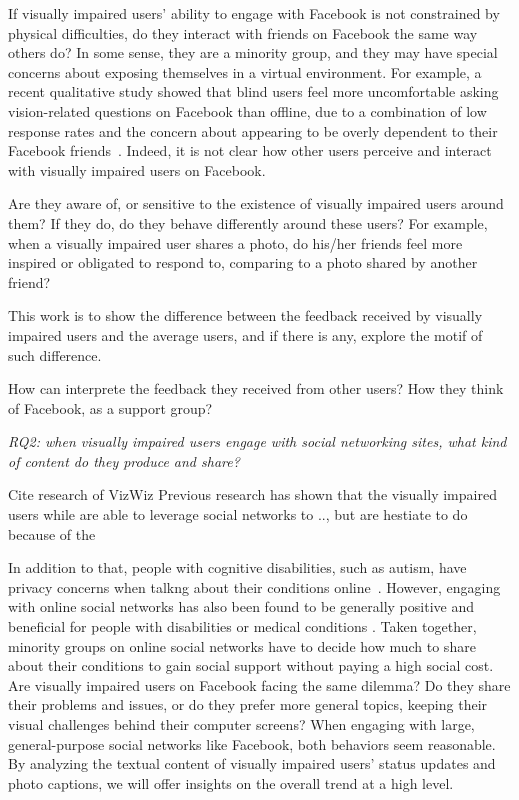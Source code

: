 \documentclass{sigchi}
\begin{document}

If visually impaired users' ability to engage with Facebook is not constrained by physical difficulties, do they interact with friends on Facebook the same way others do? In some sense, they are a minority group, and they may have special concerns about exposing themselves in a virtual environment. For example, a recent qualitative study showed that blind users feel more uncomfortable asking vision-related questions on Facebook than offline, due to a combination of low response rates and the concern about appearing to be overly dependent to their Facebook friends~\cite{brady2013cscw}. Indeed, it is not clear how other users perceive and interact with visually impaired users on Facebook. 

Are they aware of, or sensitive to the existence of visually impaired users around them? If they do, do they behave differently  around these users? For example, when a visually impaired user shares a photo, do his/her friends feel more inspired or obligated to respond to, comparing to a photo shared by another friend? 

This work is to show the difference between the feedback received by visually impaired users and the average users, and if there is any, explore the motif of such difference. 

How can interprete the feedback they received from other users? How they think of Facebook, as a support group?

\emph{RQ2: when visually impaired users engage with social networking sites, what kind of content do they produce and share? }

Cite research of VizWiz
Previous research has shown that the visually impaired users while are able to leverage social networks to .., but are hestiate to do because of the 

In addition to that, people with cognitive disabilities, such as autism, have privacy concerns when talkng about their conditions online~\cite{burke:2010}. However, engaging with online social networks has also been found to be generally positive and beneficial for people with disabilities or medical conditions \cite{burke:2010,tsaousides2011}. Taken together, minority groups on online social networks have to decide how much to share about their conditions to gain social support without paying a high social cost. Are visually impaired users on Facebook facing the same dilemma?  Do they share their problems and issues, or do they prefer more general topics, keeping their visual challenges behind their computer screens? When engaging with large, general-purpose social networks like Facebook, both behaviors seem reasonable. By analyzing the textual content of visually impaired users' status updates and photo captions, we will offer insights on the overall trend at a high level.
\end{document}
